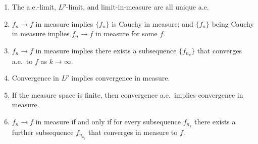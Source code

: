 \begin{thm} \label{thm:relation-modes-conv} \leavevmode
    \begin{enumerate}
        \item The a.e.-limit, $L^p$-limit, and limit-in-measure are all unique a.e.
        \item $f_n \to f$ in measure implies $\{f_n\}$ is Cauchy in measure; and $\{f_n\}$ being Cauchy in measure implies $f_n \to f$ in measure for some $f$.
        \item \label{enu:measure-subseq-ae} $f_n \to f$ in measure implies there exists a subsequence $\{f_{n_k}\}$ that converges a.e.\ to $f$ as $k \to \infty$.
        \item Convergence in $L^p$ implies convergence in measure.
        \item \label{enu:ae-implies-meas} If the measure space is finite, then convergence a.e.\ implies convergence in measure.
        \item $f_n \to f$ in measure if and only if for every subsequence $f_{n_k}$ there exists a further subsequence $f_{n_{k_j}}$ that converges in measure to $f$. %
    \end{enumerate}
\end{thm}
